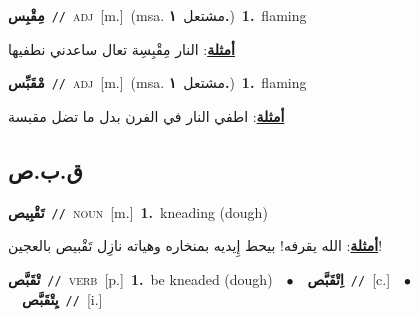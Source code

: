 \documentclass[10pt,a4paper,twoside]{article} %
\begin{document}
\begin{multicols}{2}
{\setlength\topsep{0pt}\textbf{\foreignlanguage{arabic}{مِقْبِس}}\ {\color{gray}\texttt{//}\color{black}}\ \textsc{adj}\ [m.]\ \color{gray}(msa. \foreignlanguage{arabic}{مشتعل}~\foreignlanguage{arabic}{\textbf{١.}})\color{black}\ \textbf{1.}~flaming\  \begin{flushright}\color{gray}\foreignlanguage{arabic}{\textbf{\underline{\foreignlanguage{arabic}{أمثلة}}}: النار مِقْبِسِة تعال ساعدني نطفيها}\end{flushright}\color{black}} \vspace{2mm}

{\setlength\topsep{0pt}\textbf{\foreignlanguage{arabic}{مْقَبِّس}}\ {\color{gray}\texttt{//}\color{black}}\ \textsc{adj}\ [m.]\ \color{gray}(msa. \foreignlanguage{arabic}{مشتعل}~\foreignlanguage{arabic}{\textbf{١.}})\color{black}\ \textbf{1.}~flaming\  \begin{flushright}\color{gray}\foreignlanguage{arabic}{\textbf{\underline{\foreignlanguage{arabic}{أمثلة}}}: اطفي النار في الفرن بدل ما تضل مقبسة}\end{flushright}\color{black}} \vspace{2mm}

\vspace{-3mm}
\subsection*{\color{blue}\foreignlanguage{arabic}{ق.ب.ص}\color{blue}{}} 

{\setlength\topsep{0pt}\textbf{\foreignlanguage{arabic}{تَقْبِيص}}\ {\color{gray}\texttt{//}\color{black}}\ \textsc{noun}\ [m.]\ \textbf{1.}~kneading (dough)\  \begin{flushright}\color{gray}\foreignlanguage{arabic}{\textbf{\underline{\foreignlanguage{arabic}{أمثلة}}}: الله يقرفه! بيحط إِيديه بمنخاره وهياته نازِل تَقْبيص بالعجين!}\end{flushright}\color{black}} \vspace{2mm}

{\setlength\topsep{0pt}\textbf{\foreignlanguage{arabic}{تْقَبَّص}}\ {\color{gray}\texttt{//}\color{black}}\ \textsc{verb}\ [p.]\ \textbf{1.}~be kneaded (dough)\ \ $\bullet$\ \ \setlength\topsep{0pt}\textbf{\foreignlanguage{arabic}{اِتْقَبَّص}}\ {\color{gray}\texttt{//}\color{black}}\ [c.]\ \ $\bullet$\ \ \setlength\topsep{0pt}\textbf{\foreignlanguage{arabic}{يِتْقَبَّص}}\ {\color{gray}\texttt{//}\color{black}}\ [i.]\ } \vspace{2mm}


\end{multicols}
\end{document}
